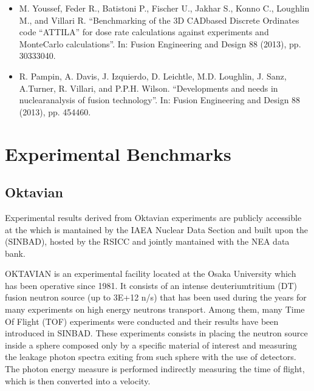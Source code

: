 \documentclass[letterpaper,10pt,english]{sphinxmanual}
\begin{document}
\nopagebreak


\sphinxAtStartPar
{}
\begin{itemize}
\item {} 
\sphinxAtStartPar
M. Youssef, Feder R., Batistoni P., Fischer U., Jakhar S., Konno C., Lough\sphinxhyphen{}lin M.,
and Villari R. “Benchmarking of the 3\sphinxhyphen{}D CAD\sphinxhyphen{}based Discrete Ordinates code “ATTILA”
for dose rate calculations against experiments and MonteCarlo calculations”.
In: Fusion Engineering and Design 88 (2013), pp. 3033\textendash{}3040.

\item {} 
\sphinxAtStartPar
R. Pampin, A. Davis, J. Izquierdo, D. Leichtle, M.D. Loughlin, J. Sanz, A.Turner,
R. Villari, and P.P.H. Wilson. “Developments and needs in nuclearanalysis of
fusion technology”. In: Fusion Engineering and Design 88 (2013), pp. 454\textendash{}460.

\end{itemize}




\section{Experimental Benchmarks}
\label{\detokenize{usage/benchmarks:experimental-benchmarks}}

\subsection{Oktavian}
\label{\detokenize{usage/benchmarks:oktavian}}
\sphinxAtStartPar
Experimental results derived from Oktavian experiments are publicly accessible at the
 which is mantained by the
IAEA Nuclear Data Section and built upon the
 (SINBAD), hosted
by the RSICC and jointly mantained with the NEA data bank.

\sphinxAtStartPar
OKTAVIAN is an experimental facility located at the Osaka University which has been
operative since 1981. It consists of an intense deuterium\sphinxhyphen{}tritium (D\sphinxhyphen{}T) fusion
neutron source (up to 3E+12 n/s) that has been used during the years for
many experiments on high energy neutrons transport. Among them, many Time Of Flight
(TOF) experiments were conducted and their results have been
introduced in SINBAD. These experiments consists in placing the neutron source inside
a sphere composed only by a specific material of interest and measuring the leakage
photon spectra exiting from such sphere with the use of detectors. The photon energy
measure is performed indirectly measuring the time of flight, which is then converted
into a velocity.
\end{document}
